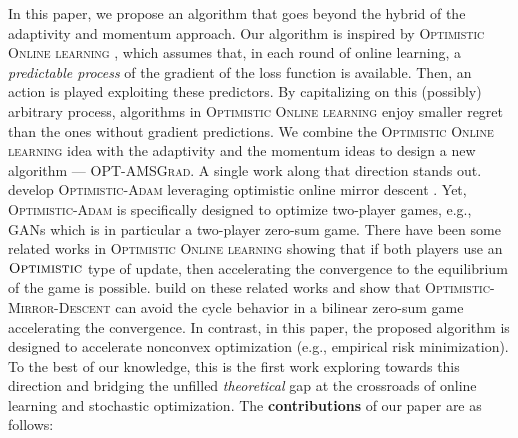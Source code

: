 \documentclass[wcp]{jmlr}
\begin{document}
In this paper, we propose an algorithm that goes beyond the hybrid of the adaptivity and momentum approach. 
Our algorithm is inspired by \textsc{Optimistic Online learning} \citep{CJ12,RS13b,SALS15,ALLW18,mertikopoulos2018optimistic}, which assumes that, in each round of online learning, a \emph{predictable process} of the gradient of the loss function is available. 
Then, an action is played exploiting these predictors. 
By capitalizing on this (possibly) arbitrary process, algorithms in \textsc{Optimistic Online learning} enjoy smaller regret than the ones without gradient predictions.
We combine the \textsc{Optimistic Online learning} idea with the adaptivity and the momentum ideas to design a new algorithm --- \textsc{OPT-AMSGrad}. 
A single work along that direction stands out. 
\cite{DISZ18} develop \textsc{Optimistic-Adam} leveraging optimistic online mirror descent \citep{RS13b}.
Yet, \textsc{Optimistic-Adam} is specifically designed to optimize two-player games, e.g., GANs \citep{goodfellow2014generative} which is in particular a two-player zero-sum game. 
There have been some related works in \textsc{Optimistic Online learning} \citep{CJ12,RS13b,SALS15} showing that if both players use an $\textsc{Optimistic}$ type of update, then accelerating the convergence to the equilibrium of the game is possible.
\cite{DISZ18} build on these related works and show that \textsc{Optimistic-Mirror-Descent} can avoid the cycle behavior in a bilinear zero-sum game accelerating the convergence. 
In contrast, in this paper, the proposed algorithm is designed to accelerate nonconvex optimization (e.g., empirical risk minimization).
To the best of our knowledge, this is the first work exploring towards this direction and bridging the unfilled \emph{theoretical} gap at the crossroads of online learning and stochastic optimization.
The \textbf{contributions} of our paper are as follows:
\end{document}
